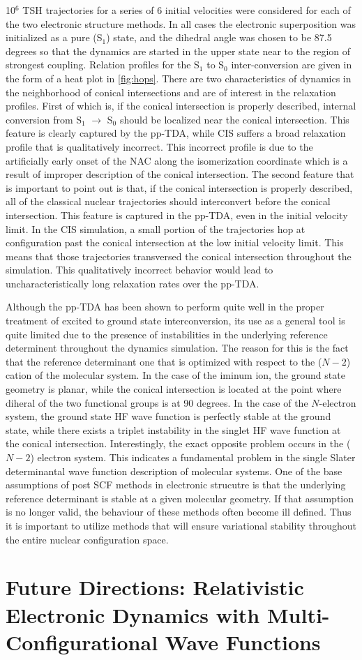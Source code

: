 \documentclass[12pt]{article}
\begin{document}
10$^6$ TSH trajectories for a series of 6 initial velocities were considered for
each of the two electronic structure methods.  In all cases the electronic
superposition was initialized as a pure (S$_1$) state, and the dihedral angle
was chosen to be 87.5 degrees so that the dynamics are started in the upper
state near to the region of strongest coupling. Relation profiles for the S$_1$
to S$_0$ inter-conversion are given in the form of a heat plot in
\cref{fig:hops}. There are two characteristics of dynamics in the neighborhood
of conical intersections and are of interest in the relaxation
profiles\cite{Hynes14_97}. First of which is, if the conical intersection is
properly described, internal conversion from S$_1$ $\rightarrow$ S$_0$ should be
localized near the conical intersection. This feature is clearly captured by
the pp-TDA, while CIS suffers a broad relaxation profile that is qualitatively
incorrect. This incorrect profile is due to the artificially early onset of the
NAC along the isomerization coordinate which is a result of improper description
of the conical intersection. The second feature that is important to point out
is that, if the conical intersection is properly described, all of the classical
nuclear trajectories should interconvert before the conical intersection. This
feature is captured in the pp-TDA, even in the initial velocity limit. In the
CIS simulation, a small portion of the trajectories hop at configuration past
the conical intersection at the low initial velocity limit. This means that
those trajectories transversed the conical intersection throughout the
simulation. This qualitatively incorrect behavior would lead to
uncharacteristically long relaxation rates over the pp-TDA.

Although the pp-TDA has been shown to perform quite well in the proper treatment
of excited to ground state interconversion, its use as a general tool is quite
limited due to the presence of instabilities in the underlying reference
determinent throughout the dynamics simulation. The reason for this is the fact
that the reference determinant one that is optimized with respect to the ($N-2$)
cation of the molecular system. In the case of the iminum ion, the ground state
geometry is planar, while the conical intersection is located at the point where
diheral of the two functional groups is at 90 degrees. In the case of the
$N$-electron system, the ground state HF wave function is perfectly stable at
the ground state, while there exists a triplet instability in the singlet HF
wave function at the conical intersection. Interestingly, the exact opposite
problem occurs in the ($N-2$) electron system. This indicates a fundamental
problem in the single Slater determinantal wave function description of
molecular systems. One of the base assumptions of post SCF methods in electronic
strucutre is that the underlying reference determinant is stable at a given
molecular geometry. If that assumption is no longer valid, the behaviour of
these methods often become ill defined. Thus it is important to utilize methods
that will ensure variational stability throughout the entire nuclear
configuration space.

\linespread{1.0}
\section{Future Directions: Relativistic Electronic Dynamics with Multi-Configurational Wave Functions}
\linespread{1.5}
\label{sec:Future}


\end{document}
